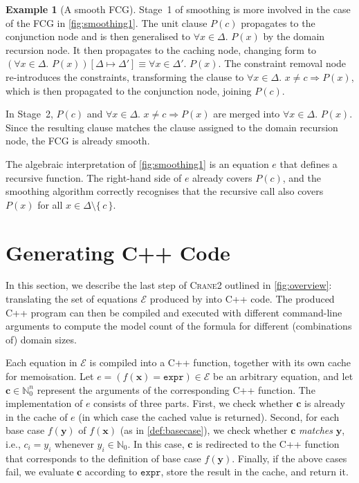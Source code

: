 \documentclass{article}
\theoremstyle{definition}
\newtheorem{example}{Example}
\newcommand{\expr}{\mathtt{expr}}
\newcommand{\Cranetwo}{\textsc{Crane2}}
\begin{document}
\begin{example}[A smooth FCG]\label{example:smooth}
  Stage~1 of smoothing is more involved in the case of the FCG in
  \cref{fig:smoothing1}. The unit clause $P(c)$ propagates to the conjunction
  node and is then generalised to $\forall x \in \Delta\text{. }P(x)$ by the
  domain recursion node. It then propagates to the caching node, changing form
  to $(\forall x \in \Delta\text{.
  }P(x))[\Delta \mapsto \Delta'] \equiv \forall x \in \Delta'\text{. }P(x)$. The
  constraint removal node re-introduces the constraints, transforming the clause
  to $\forall x \in \Delta\text{. }x \ne c \Rightarrow P(x)$, which is then
  propagated to the conjunction node, joining $P(c)$.

  In Stage~2, $P(c)$ and $\forall x \in \Delta\text{. }x \ne c \Rightarrow P(x)$
  are merged into $\forall x \in \Delta\text{. }P(x)$. Since the resulting
  clause matches the clause assigned to the domain recursion node, the FCG is
  already smooth.
\end{example}

The algebraic interpretation of \cref{fig:smoothing1} is an equation $e$ that
defines a recursive function. The right-hand side of $e$ already covers $P(c)$,
and the smoothing algorithm correctly recognises that the recursive call also
covers $P(x)$ for all $x \in \Delta \setminus \{\, c \,\}$.

\section{Generating C++ Code}\label{sec:cpp}

In this section, we describe the last step of \Cranetwo{} outlined in
\cref{fig:overview}: translating the set of equations $\mathcal{E}$ produced by
\CompileWithBaseCases into C++ code. The produced C++ program can then be
compiled and executed with different command-line arguments to compute the model
count of the formula for different (combinations of) domain sizes.

Each equation in $\mathcal{E}$ is compiled into a C++ function, together with
its own cache for memoisation. Let
$e = (f(\mathbf{x}) = \expr{}) \in \mathcal{E}$ be an arbitrary equation, and
let $\mathbf{c} \in \mathbb{N}_{0}^{n}$ represent the arguments of the
corresponding C++ function. The implementation of $e$ consists of three parts.
First, we check whether $\mathbf{c}$ is already in the cache of $e$ (in which
case the cached value is returned). Second, for each base case $f(\mathbf{y})$
of $f(\mathbf{x})$ (as in \cref{def:basecase}), we check whether $\mathbf{c}$
\emph{matches} $\mathbf{y}$, i.e., $c_{i} = y_{i}$ whenever
$y_{i} \in \mathbb{N}_{0}$. In this case, $\mathbf{c}$ is redirected to the C++
function that corresponds to the definition of base case $f(\mathbf{y})$.
Finally, if the above cases fail, we evaluate $\mathbf{c}$ according to
$\expr{}$, store the result in the cache, and return it.
\end{document}
